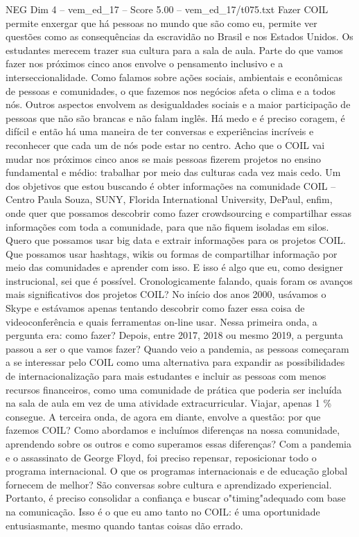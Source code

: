 \begin{textsample}{NEG Dim 4 – vem\_ed\_17 – Score 5.00 – vem\_ed\_17/t075.txt}  \label{ex:f4_neg_085}
Fazer COIL permite enxergar que há pessoas no mundo que são como eu, permite ver questões como as consequências da escravidão no Brasil e nos Estados Unidos.
Os estudantes merecem trazer sua cultura para a sala de aula.
Parte do que vamos fazer nos próximos cinco anos envolve o pensamento inclusivo e a interseccionalidade.
Como falamos sobre ações sociais, ambientais e econômicas de pessoas e comunidades, o que fazemos nos negócios afeta o clima e a todos nós.
Outros aspectos envolvem as desigualdades sociais e a maior participação de pessoas que não são brancas e não falam inglês.
Há medo e é preciso coragem, é difícil e então há uma maneira de ter conversas e experiências incríveis e reconhecer que cada um de nós pode estar no centro.
Acho que o COIL vai mudar nos próximos cinco anos se mais pessoas fizerem projetos no ensino fundamental e médio: trabalhar por meio das culturas cada vez mais cedo.
Um dos objetivos que estou buscando é obter informações na comunidade COIL – Centro Paula Souza, SUNY, Florida International University, DePaul, enfim, onde quer que possamos descobrir como fazer crowdsourcing e compartilhar essas informações com toda a comunidade, para que não fiquem isoladas em silos.
Quero que possamos usar big data e extrair informações para os projetos COIL.
Que possamos usar hashtags, wikis ou formas de compartilhar informação por meio das comunidades e aprender com isso.
E isso é algo que eu, como designer instrucional, sei que é possível.
Cronologicamente falando, quais foram os avanços mais significativos dos projetos COIL?
No início dos anos 2000, usávamos o Skype e estávamos apenas tentando descobrir como fazer essa coisa de videoconferência e quais ferramentas on-line usar.
Nessa primeira onda, a pergunta era: como fazer?
Depois, entre 2017, 2018 ou mesmo 2019, a pergunta passou a ser o que vamos fazer?
Quando veio a pandemia, as pessoas começaram a se interessar pelo COIL como uma alternativa para expandir as possibilidades de internacionalização para mais estudantes e incluir as pessoas com menos recursos financeiros, como uma comunidade de prática que poderia ser incluída na sala de aula em vez de uma atividade extracurricular.
Viajar, apenas 1 \% consegue.
A terceira onda, de agora em diante, envolve a questão: por que fazemos COIL?
Como abordamos e incluímos diferenças na nossa comunidade, aprendendo sobre os outros e como superamos essas diferenças?
Com a pandemia e o assassinato de George Floyd, foi preciso repensar, reposicionar todo o programa internacional.
O que os programas internacionais e de educação global fornecem de melhor?
São conversas sobre cultura e aprendizado experiencial.
Portanto, é preciso consolidar a confiança e buscar o"timing"adequado com base na comunicação.
Isso é o que eu amo tanto no COIL: é uma oportunidade entusiasmante, mesmo quando tantas coisas dão errado.

\end{textsample}
